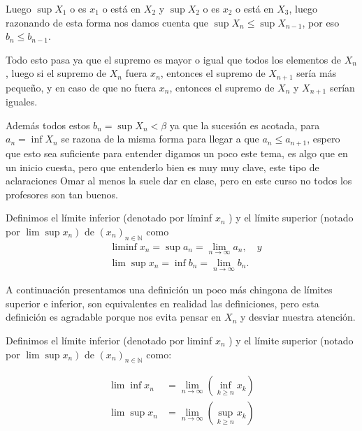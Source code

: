 \begin{itemize}[leftmargin=*]
\begin{note}
Luego $\sup X_1$ o es $x_1$ o está en $X_2$ y $\sup X_2$ o es $x_2$ o está en $X_3$, luego razonando de esta forma nos damos cuenta que $\sup X_n\leq \sup X_{n-1}$, por eso $b_n\leq b_{n-1}$.
\end{note}

\begin{note}
Todo esto pasa ya que el supremo es mayor o igual que todos los elementos de $X_n$, luego si el supremo de $X_n$ fuera $x_n$, entonces el supremo de $X_{n+1}$ sería más pequeño, y en caso de que no fuera $x_n$, entonces el supremo de $X_n$ y $X_{n+1}$ serían iguales.
\end{note}

Además todos estos $b_n=\sup X_n<\beta$ ya que la sucesión es acotada, para $a_n=\inf X_n$ se razona de la misma forma para llegar a que $a_n\leq a_{n+1}$, espero que esto sea suficiente para entender digamos un poco este tema, es algo que en un inicio cuesta, pero que entenderlo bien es muy muy clave, este tipo de aclaraciones Omar al menos la suele dar en clase, pero en este curso no todos los profesores son tan buenos. 



\begin{definition}
Definimos el límite inferior (denotado por líminf $x_n$ ) y el límite superior (notado por $\left.\operatorname{lim} \sup x_n\right)$ de $\left(x_n\right)_{n \in \mathbb{N}}$ como
$$
\begin{aligned}
& \liminf x_n=\sup a_n=\lim _{n \rightarrow \infty} a_n, \quad y \\
& \lim \sup x_n=\inf b_n=\lim _{n \rightarrow \infty} b_n .
\end{aligned}
$$    
\end{definition}

A continuación presentamos una definición un poco más chingona de límites superior e inferior, son equivalentes en realidad las definiciones, pero esta definición es agradable porque nos evita pensar en $X_n$ y desviar nuestra atención.

\begin{definition}

Definimos el límite inferior (denotado por liminf $x_n$ ) y el límite superior (notado por $\left.\operatorname{lim} \sup x_n\right)$ de $\left(x_n\right)_{n \in \mathbb{N}}$ como:

$$    \begin{aligned}
\lim \inf x_n & =\lim _{n \rightarrow \infty}\left(\inf _{k \geq n} x_k\right) \\
\lim \sup x_n & =\lim _{n \rightarrow \infty}\left(\sup _{k \geq n} x_k\right)
\end{aligned}$$


\end{definition}
\end{itemize}
